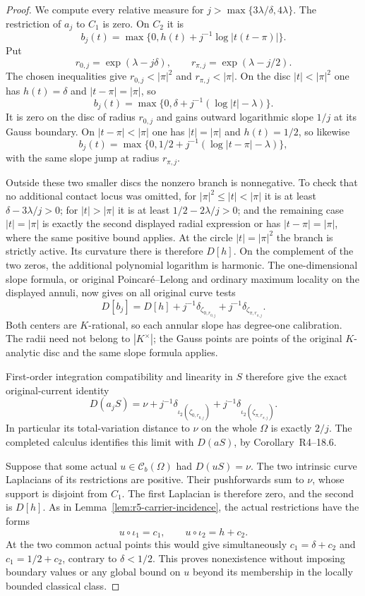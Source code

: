 \documentclass[11pt,a4paper]{article}
\numberwithin{equation}{section}
\theoremstyle{definition}
\theoremstyle{remark}
\begin{document}
\begin{proof}
We compute every relative measure for
$j>\max\{3\lambda/\delta,4\lambda\}$.
The restriction of $a_j$ to $C_1$ is zero.  On $C_2$ it is
\[
       b_j(t)=\max\{0,h(t)+j^{-1}\log|t(t-\pi)|\}.
\]
Put
\[
             r_{0,j}=\exp(\lambda-j\delta),\qquad
             r_{\pi,j}=\exp(\lambda-j/2).
\]
The chosen inequalities give $r_{0,j}<|\pi|^2$ and
$r_{\pi,j}<|\pi|$.  On the disc $|t|<|\pi|^2$ one has
$h(t)=\delta$ and $|t-\pi|=|\pi|$, so
\[
 b_j(t)=\max\{0,\delta+j^{-1}(\log|t|-\lambda)\}.
\]
It is zero on the disc of radius $r_{0,j}$ and gains outward
logarithmic slope $1/j$ at its Gauss boundary.
On $|t-\pi|<|\pi|$ one has $|t|=|\pi|$ and $h(t)=1/2$,
so likewise
\[
 b_j(t)=\max\{0,1/2+j^{-1}(\log|t-\pi|-\lambda)\},
\]
with the same slope jump at radius $r_{\pi,j}$.

Outside these two smaller discs the nonzero branch is
nonnegative.  To check that no additional contact locus was
omitted, for $|\pi|^2\le|t|<|\pi|$ it is at least
$\delta-3\lambda/j>0$; for $|t|>|\pi|$ it is at least
$1/2-2\lambda/j>0$; and the remaining case $|t|=|\pi|$
is exactly the second displayed radial expression or has
$|t-\pi|=|\pi|$, where the same positive bound applies.
At the circle $|t|=|\pi|^2$ the branch is strictly active.
Its curvature there is therefore $D[h]$.  On the complement
of the two zeros, the additional polynomial logarithm is
harmonic.  The one-dimensional slope formula, or original
Poincar\'e--Lelong and ordinary maximum locality on the
displayed annuli, now gives on all original curve tests
\[
 D[b_j]
   =D[h]+j^{-1}\delta_{\zeta_{0,r_{0,j}}}
                       +j^{-1}\delta_{\zeta_{\pi,r_{\pi,j}}}.
\]
Both centers are $K$-rational, so each annular slope has
degree-one calibration.  The radii need not belong to
$|K^\times|$; the Gauss points are points of the original
$K$-analytic disc and the same slope formula applies.

First-order integration compatibility and linearity in $S$
therefore give the exact original-current identity
\begin{equation}
 D(a_jS)=\nu+j^{-1}\delta_{\iota_2(\zeta_{0,r_{0,j}})}
                    +j^{-1}\delta_{\iota_2(\zeta_{\pi,r_{\pi,j}})}.
 \label{eq:r5-two-intersection-exact-measure}
\end{equation}
In particular its total-variation distance to $\nu$ on the
whole $\Omega$ is exactly $2/j$.  The completed calculus
identifies this limit with $D(aS)$, by
Corollary~\textup{R4--18.6}.

Suppose that some actual $u\in\mathcal C_b(\Omega)$ had
$D(uS)=\nu$.  The two intrinsic curve Laplacians of its
restrictions are positive.  Their pushforwards sum to
$\nu$, whose support is disjoint from $C_1$.  The first
Laplacian is therefore zero, and the second is $D[h]$.
As in Lemma~\ref{lem:r5-carrier-incidence}, the actual
restrictions have the forms
\[
                    u\circ\iota_1=c_1,\qquad
                    u\circ\iota_2=h+c_2.
\]
At the two common actual points this would give simultaneously
$c_1=\delta+c_2$ and $c_1=1/2+c_2$, contrary to
$\delta<1/2$.  This proves nonexistence without imposing
boundary values or any global bound on $u$ beyond its
membership in the locally bounded classical class.


\end{proof}
\end{document}
